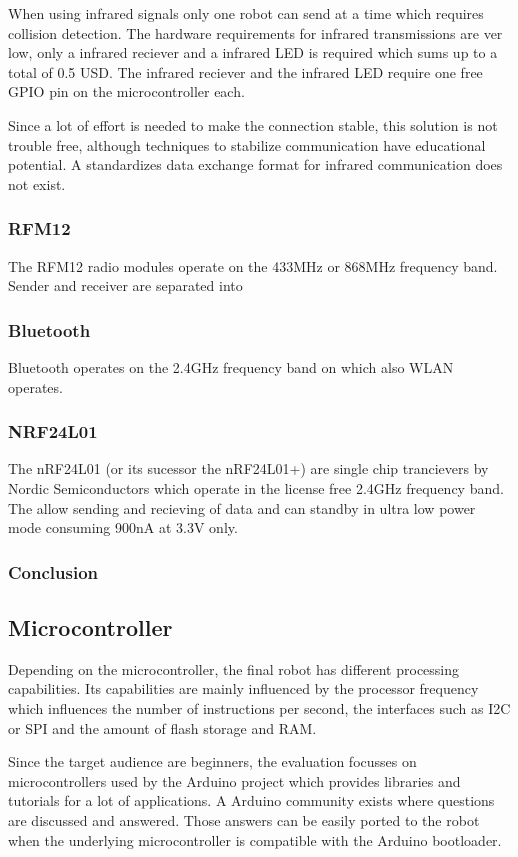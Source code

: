 \documentclass[11pt,a4paper]{article}
\begin{document}
When using infrared signals only one robot can send at a time which requires collision detection. The hardware requirements for infrared transmissions are ver low, only a infrared reciever and a infrared LED is required which sums up to a total of 0.5 USD. The infrared reciever and the infrared LED require one free GPIO pin on the microcontroller each.

Since a lot of effort is needed to make the connection stable, this solution is not trouble free, although techniques to stabilize communication have educational potential. A standardizes data exchange format for infrared communication does not exist.

\subsubsection{RFM12}
The RFM12 radio modules operate on the 433MHz or 868MHz frequency band. Sender and receiver are separated into 

\subsubsection{Bluetooth}
Bluetooth operates on the 2.4GHz frequency band on which also WLAN operates.

\subsubsection{NRF24L01}
The nRF24L01 (or its sucessor the nRF24L01+) are single chip trancievers by Nordic Semiconductors which operate in the license free 2.4GHz frequency band. The allow sending and recieving of data and can standby in ultra low power mode consuming 900nA at 3.3V only.

\subsubsection{Conclusion}

\subsection{Microcontroller}
Depending on the microcontroller, the final robot has different processing capabilities. Its capabilities are mainly influenced by the processor frequency which influences the number of instructions per second, the interfaces such as I2C or SPI and the amount of flash storage and RAM.

Since the target audience are beginners, the evaluation focusses on microcontrollers used by the Arduino project which provides libraries and tutorials for a lot of applications. A Arduino community exists where questions are discussed and answered. Those answers can be easily ported to the robot when the underlying microcontroller is compatible with the Arduino bootloader.
\end{document}
